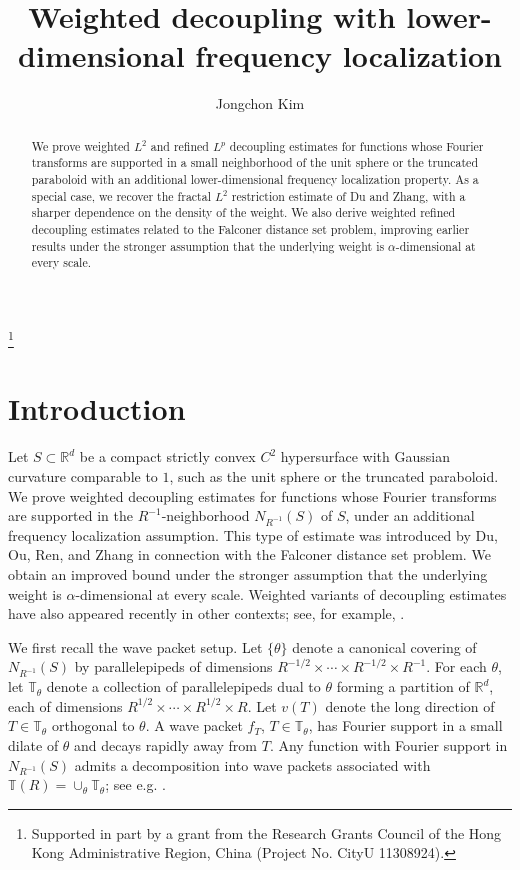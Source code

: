 \documentclass[11pt]{amsart}
\theoremstyle{definition}
\theoremstyle{remark}
\numberwithin{equation}{section}
\newcommand{\R}{\mathbb{R}}
\newcommand{\T}{\mathbb{T}}
\begin{document}
	\title[Weighted refined decoupling with concentrated frequencies]{Weighted  decoupling with lower-dimensional frequency localization}	
	\author{Jongchon Kim}
	\address{Department of Mathematics, City University of Hong Kong, Hong Kong SAR, China}
	\thanks{Supported in part by a grant from the Research Grants Council of the Hong Kong Administrative Region, China (Project No. CityU 11308924).}
	
	\begin{abstract} 
		We prove weighted $L^2$ and refined $L^p$ decoupling estimates for functions whose Fourier transforms are supported in a small neighborhood of the unit sphere or the truncated paraboloid  with an additional lower-dimensional frequency localization property. 	As a special case, we recover the fractal $L^2$ restriction estimate of Du and Zhang, with a sharper dependence on the density of the weight. We also derive weighted refined decoupling estimates related to the Falconer distance set problem, improving earlier results under the stronger assumption that the underlying weight is $\alpha$-dimensional at every scale.
	\end{abstract}
	
	\maketitle


\section{Introduction}
Let $S\subset\R^d$ be a compact strictly convex $C^2$ hypersurface with Gaussian curvature comparable to $1$, such as the unit sphere or the truncated paraboloid. 
We prove weighted decoupling estimates for functions whose Fourier transforms are supported in the $R^{-1}$-neighborhood $N_{R^{-1}}(S)$ of $S$, under an additional frequency localization assumption. This type of estimate was introduced by Du, Ou, Ren, and Zhang \cite{du2023weighted} in connection with the Falconer distance set problem. We obtain an improved bound under the stronger assumption that the underlying weight is $\alpha$-dimensional at every scale. Weighted variants of decoupling estimates have also appeared recently in other contexts; see, for example, \cite{GanWu, KimWeightedDec, CLPY}.

We first recall the wave packet setup. Let $\{ \theta\}$ denote a canonical covering of $N_{R^{-1}}(S)$ by parallelepipeds of dimensions $R^{-1/2} \times \cdots \times R^{-1/2} \times R^{-1}$. For each $\theta$, let $\T_\theta$ denote a collection of parallelepipeds dual to $\theta$ forming a partition of $\R^d$, each of dimensions $R^{1/2} \times \cdots \times R^{1/2} \times R$. Let $v(T)$ denote the long direction of $T\in \T_\theta$ orthogonal to $\theta$. A wave packet $f_T$, $T\in \T_\theta$, has Fourier support in a small dilate of $\theta$ and decays rapidly away from $T$. Any function with Fourier support in $N_{R^{-1}}(S)$ admits a decomposition into wave packets associated with $\T(R) = \cup_\theta \T_\theta$; see e.g. \cite[Appendix A.2]{decouplingstudy}. 
\end{document}
